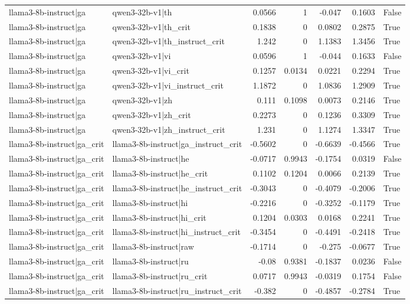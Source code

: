 \begin{table}
\begin{tabular}{l l r r r r l}
llama3-8b-instruct|ga & qwen3-32b-v1|th & 0.0566 & 1 & -0.047 & 0.1603 & False \\
llama3-8b-instruct|ga & qwen3-32b-v1|th_crit & 0.1838 & 0 & 0.0802 & 0.2875 & True \\
llama3-8b-instruct|ga & qwen3-32b-v1|th_instruct_crit & 1.242 & 0 & 1.1383 & 1.3456 & True \\
llama3-8b-instruct|ga & qwen3-32b-v1|vi & 0.0596 & 1 & -0.044 & 0.1633 & False \\
llama3-8b-instruct|ga & qwen3-32b-v1|vi_crit & 0.1257 & 0.0134 & 0.0221 & 0.2294 & True \\
llama3-8b-instruct|ga & qwen3-32b-v1|vi_instruct_crit & 1.1872 & 0 & 1.0836 & 1.2909 & True \\
llama3-8b-instruct|ga & qwen3-32b-v1|zh & 0.111 & 0.1098 & 0.0073 & 0.2146 & True \\
llama3-8b-instruct|ga & qwen3-32b-v1|zh_crit & 0.2273 & 0 & 0.1236 & 0.3309 & True \\
llama3-8b-instruct|ga & qwen3-32b-v1|zh_instruct_crit & 1.231 & 0 & 1.1274 & 1.3347 & True \\
llama3-8b-instruct|ga_crit & llama3-8b-instruct|ga_instruct_crit & -0.5602 & 0 & -0.6639 & -0.4566 & True \\
llama3-8b-instruct|ga_crit & llama3-8b-instruct|he & -0.0717 & 0.9943 & -0.1754 & 0.0319 & False \\
llama3-8b-instruct|ga_crit & llama3-8b-instruct|he_crit & 0.1102 & 0.1204 & 0.0066 & 0.2139 & True \\
llama3-8b-instruct|ga_crit & llama3-8b-instruct|he_instruct_crit & -0.3043 & 0 & -0.4079 & -0.2006 & True \\
llama3-8b-instruct|ga_crit & llama3-8b-instruct|hi & -0.2216 & 0 & -0.3252 & -0.1179 & True \\
llama3-8b-instruct|ga_crit & llama3-8b-instruct|hi_crit & 0.1204 & 0.0303 & 0.0168 & 0.2241 & True \\
llama3-8b-instruct|ga_crit & llama3-8b-instruct|hi_instruct_crit & -0.3454 & 0 & -0.4491 & -0.2418 & True \\
llama3-8b-instruct|ga_crit & llama3-8b-instruct|raw & -0.1714 & 0 & -0.275 & -0.0677 & True \\
llama3-8b-instruct|ga_crit & llama3-8b-instruct|ru & -0.08 & 0.9381 & -0.1837 & 0.0236 & False \\
llama3-8b-instruct|ga_crit & llama3-8b-instruct|ru_crit & 0.0717 & 0.9943 & -0.0319 & 0.1754 & False \\
llama3-8b-instruct|ga_crit & llama3-8b-instruct|ru_instruct_crit & -0.382 & 0 & -0.4857 & -0.2784 & True \\

\end{tabular}
\end{table}
